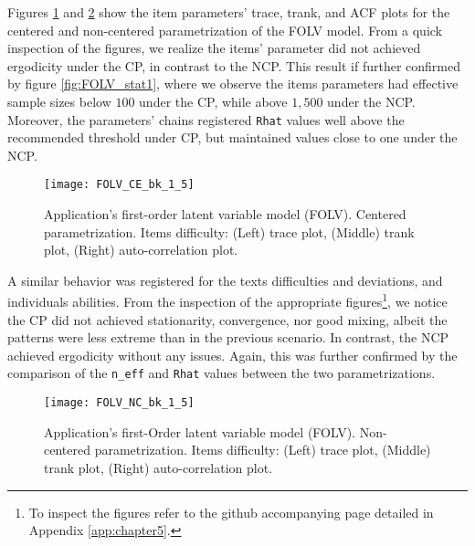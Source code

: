 Figures \ref{fig:FOLV_CE_chains1} and \ref{fig:FOLV_NC_chains1} show the item parameters' trace, trank, and ACF plots for the centered and non-centered parametrization of the FOLV model. From a quick inspection of the figures, we realize the items' parameter did not achieved ergodicity under the CP, in contrast to the NCP. This result if further confirmed by figure \ref{fig:FOLV_stat1}, where we observe the items parameters had effective sample sizes below $100$ under the CP, while above $1,500$ under the NCP. Moreover, the parameters' chains registered \texttt{Rhat} values well above the recommended threshold under CP, but maintained values close to one under the NCP.
%
\begin{figure}[H]
	\centering
	\texttt{[image: FOLV\_CE\_bk\_1\_5]}
	\caption[Application's first-order latent variable model (FOLV). Centered parametrization. Items difficulty. Trace, trank and auto-correlation plots.]%
	{Application's first-order latent variable model (FOLV). Centered parametrization. Items difficulty: (Left) trace plot, (Middle) trank plot, (Right) auto-correlation plot.}
	\label{fig:FOLV_CE_chains1}
\end{figure}

A similar behavior was registered for the texts difficulties and deviations, and individuals abilities. From the inspection of the appropriate figures\footnote{To inspect the figures refer to the github accompanying page detailed in Appendix \ref{app:chapter5}.}, we notice the CP did not achieved stationarity, convergence, nor good mixing, albeit the patterns were less extreme than in the previous scenario. In contrast, the NCP achieved ergodicity without any issues. Again, this was further confirmed by the comparison of the \texttt{n\_eff} and \texttt{Rhat} values between the two parametrizations.
%
\begin{figure}[H]
	\centering
	\texttt{[image: FOLV\_NC\_bk\_1\_5]}
	\caption[Application's first-order latent variable model (FOLV). Non-centered parametrization. Items difficulty. Trace, trank and auto-correlation plots.]%
	{Application's first-Order latent variable model (FOLV). Non-centered parametrization. Items difficulty: (Left) trace plot, (Middle) trank plot, (Right) auto-correlation plot.}
	\label{fig:FOLV_NC_chains1}
\end{figure}

